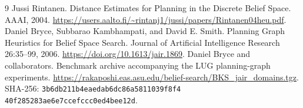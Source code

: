 \documentclass[11pt]{article}
\theoremstyle{definition}
\begin{document}
\begin{thebibliography}{9}
 Jussi Rintanen. Distance Estimates for Planning in the Discrete
Belief Space. AAAI, 2004.
\url{https://users.aalto.fi/~rintanj1/jussi/papers/Rintanen04heu.pdf}.
 Daniel Bryce, Subbarao Kambhampati, and David E. Smith.
Planning Graph Heuristics for Belief Space Search. Journal of Artificial
Intelligence Research 26:35--99, 2006.
\url{https://doi.org/10.1613/jair.1869}.
 Daniel Bryce and collaborators. Benchmark archive accompanying
the LUG planning-graph experiments.
\url{https://rakaposhi.eas.asu.edu/belief-search/BKS_jair_domains.tgz}.
SHA-256: \texttt{3b6db211b4eaedab6dc86a5811039f8f4}\\
\texttt{40f285283ae6e7ccefccc0ed4bee12d}.
\end{thebibliography}
\end{document}
